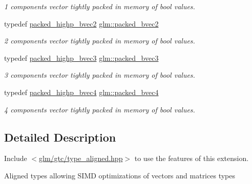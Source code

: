 \begin{DoxyCompactItemize}
\begin{DoxyCompactList}\small\item\em 1 components vector tightly packed in memory of bool values. \end{DoxyCompactList}\item 
\mbox{\label{group__gtc__type__aligned_gabbb5ab4c9a0de67e04e2f183c0bff576}} 
typedef \hyperlink{group__gtc__type__aligned_ga8059c50785881a9f30b9a8e3ff5daf83}{packed\+\_\+highp\+\_\+bvec2} \hyperlink{group__gtc__type__aligned_gabbb5ab4c9a0de67e04e2f183c0bff576}{glm\+::packed\+\_\+bvec2}
\begin{DoxyCompactList}\small\item\em 2 components vector tightly packed in memory of bool values. \end{DoxyCompactList}\item 
\mbox{\label{group__gtc__type__aligned_gae53d997456f6336eab2450117b11163e}} 
typedef \hyperlink{group__gtc__type__aligned_gafad47eaff82deab03a1e8d82d2dbd046}{packed\+\_\+highp\+\_\+bvec3} \hyperlink{group__gtc__type__aligned_gae53d997456f6336eab2450117b11163e}{glm\+::packed\+\_\+bvec3}
\begin{DoxyCompactList}\small\item\em 3 components vector tightly packed in memory of bool values. \end{DoxyCompactList}\item 
\mbox{\label{group__gtc__type__aligned_ga27837cfec1a5b6d6ae23961f93431403}} 
typedef \hyperlink{group__gtc__type__aligned_gaa7a006e26052e668a16bf3b8bd81cbef}{packed\+\_\+highp\+\_\+bvec4} \hyperlink{group__gtc__type__aligned_ga27837cfec1a5b6d6ae23961f93431403}{glm\+::packed\+\_\+bvec4}
\begin{DoxyCompactList}\small\item\em 4 components vector tightly packed in memory of bool values. \end{DoxyCompactList}\end{DoxyCompactItemize}


\subsection{Detailed Description}
Include $<$\hyperlink{gtc_2type__aligned_8hpp}{glm/gtc/type\+\_\+aligned.\+hpp}$>$ to use the features of this extension.

Aligned types allowing S\+I\+MD optimizations of vectors and matrices types 